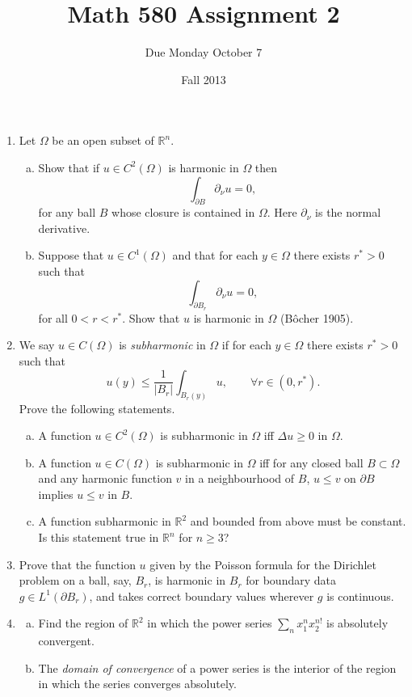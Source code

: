 \documentclass[11pt]{amsart}
\title{Math 580 Assignment 2}
\author{Due Monday October 7}
\date{Fall 2013}                                           %
\newcommand{\R}{\mathbb{R}}
\begin{document}
\maketitle

\begin{enumerate}[1.]
\item
Let $\Omega$ be an open subset of $\R^n$.
\begin{enumerate}[(a)]
\item
Show that if $u\in C^2(\Omega)$ is harmonic in $\Omega$ then
$$
\int_{\partial B}\partial_\nu u = 0,
$$
for any ball $B$ whose closure is contained in $\Omega$.
Here $\partial_\nu$ is the normal derivative.
\item
Suppose that $u\in C^1(\Omega)$ and that for each $y\in\Omega$ there exists $r^*>0$ such that
$$
\int_{\partial B_r}\partial_\nu u = 0,
$$
for all $0<r<r^*$.
Show that $u$ is harmonic in $\Omega$ (B\^ocher 1905).
\end{enumerate}
\item
We say $u\in C(\Omega)$ is {\em subharmonic} in $\Omega$ if for each $y\in\Omega$ there exists $r^*>0$ such that
$$
u(y) \leq \frac{1}{|B_r|}\int_{B_r(y)}u,
\qquad\forall r\in(0,r^*).
$$
Prove the following statements.
\begin{enumerate}[(a)]
\item
A function $u\in C^2(\Omega)$ is subharmonic in $\Omega$ iff $\Delta u\geq0$ in $\Omega$.
\item
A function $u\in C(\Omega)$ is subharmonic in $\Omega$ iff for any closed ball $B\subset\Omega$ and any harmonic function $v$
in a neighbourhood of $B$, $u\leq v$ on $\partial B$ implies $u\leq v$ in $B$.
\item
A function subharmonic in $\R^2$ and bounded from above must be constant.
Is this statement true in $\R^n$ for $n\geq3$?
\end{enumerate}
\item
Prove that the function $u$ given by the Poisson formula for the Dirichlet problem on a ball, say, $B_r$, is harmonic in $B_r$ for boundary data $g\in L^1(\partial B_r)$, 
and takes correct boundary values wherever $g$ is continuous.
\item
\begin{enumerate}[(a)]
\item
Find the region of $\R^2$ in which the power series $\sum_{n}x_1^nx_2^{n!}$ is absolutely convergent.
\item
The {\em domain of convergence} of a power series is the interior of the region in which the series converges absolutely.

\end{enumerate}
\end{enumerate}
\end{document}
